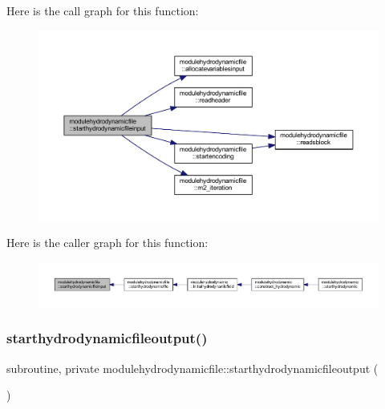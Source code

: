 Here is the call graph for this function\+:\nopagebreak
\begin{figure}[H]
\begin{center}
\leavevmode
\includegraphics[width=350pt]{namespacemodulehydrodynamicfile_aab72ffaa67d987e2e0df7cd6249eac99_cgraph}
\end{center}
\end{figure}
Here is the caller graph for this function\+:\nopagebreak
\begin{figure}[H]
\begin{center}
\leavevmode
\includegraphics[width=350pt]{namespacemodulehydrodynamicfile_aab72ffaa67d987e2e0df7cd6249eac99_icgraph}
\end{center}
\end{figure}
\mbox{\label{namespacemodulehydrodynamicfile_a782ea415676eeb21e1368c0c2dd1e710}} 
\subsubsection{\texorpdfstring{starthydrodynamicfileoutput()}{starthydrodynamicfileoutput()}}
{\footnotesize\ttfamily subroutine, private modulehydrodynamicfile\+::starthydrodynamicfileoutput (\begin{DoxyParamCaption}{ }\end{DoxyParamCaption})\hspace{0.3cm}{\ttfamily [private]}}

